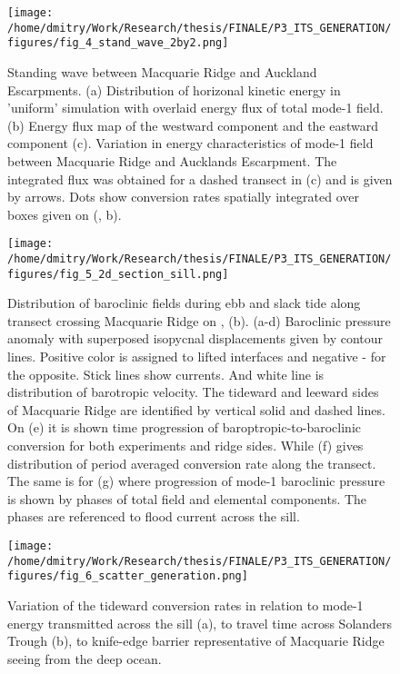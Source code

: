 \documentclass[12pt]{article}
\begin{document}
\begin{figure}
	\centering
	\texttt{[image: /home/dmitry/Work/Research/thesis/FINALE/P3\_ITS\_GENERATION/figures/fig\_4\_stand\_wave\_2by2.png]}
	\caption{Standing wave between Macquarie Ridge and Auckland Escarpments. (a) Distribution of 
	horizonal kinetic energy in 'uniform' simulation with overlaid energy flux of total mode-1 
	field. (b) Energy flux map of the westward component and the eastward component (c). Variation 
	in energy characteristics of mode-1 field between Macquarie Ridge and Aucklands Escarpment. The 
	integrated flux was obtained for a 	dashed transect in (c) and is given by arrows. Dots show 
	conversion rates spatially integrated over boxes given on (, b).}
	\label{C3.fig:stand_wave}
\end{figure}

\begin{figure}
	\centering
	\texttt{[image: /home/dmitry/Work/Research/thesis/FINALE/P3\_ITS\_GENERATION/figures/fig\_5\_2d\_section\_sill.png]}
	\caption{Distribution of baroclinic fields during ebb and slack tide along transect crossing 
	Macquarie Ridge on , (b). (a-d) Baroclinic pressure anomaly with superposed 
	isopycnal displacements given by contour lines. Positive color is assigned to lifted interfaces 
	and negative - for the opposite. Stick lines show currents. And white line is distribution 
	of barotropic velocity. The tideward and leeward sides of Macquarie Ridge are identified by 
	vertical solid and dashed lines. On (e) it is shown time progression of 
	baroptropic-to-baroclinic conversion for both experiments and ridge sides. While (f) gives 
	distribution of period averaged conversion rate along the transect. The same is for (g) where 
	progression of mode-1 baroclinic pressure is shown by phases of total field and elemental 
	components. The phases are referenced to flood current across the sill.}
	\label{C3.fig:gen_2d}
\end{figure}

\begin{figure}
	\centering
	\texttt{[image: /home/dmitry/Work/Research/thesis/FINALE/P3\_ITS\_GENERATION/figures/fig\_6\_scatter\_generation.png]}
	\caption{Variation of the tideward conversion rates in relation to mode-1 energy transmitted 
	across the sill (a), to travel time across Solanders Trough (b), to knife-edge barrier 
	representative of Macquarie Ridge seeing from the deep ocean.}
	\label{C3.fig:gen_regr}
\end{figure}
\end{document}
